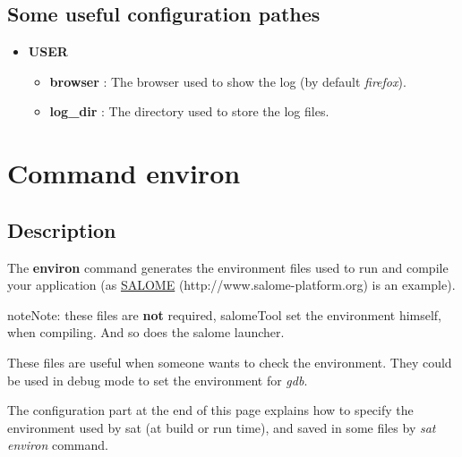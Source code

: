 \documentclass[a4paper,10pt,english]{sphinxmanual}
\begin{document}
\subsection{Some useful configuration pathes}
\label{commands/log:some-useful-configuration-pathes}\begin{itemize}
\item {} 
\textbf{USER}
\begin{itemize}
\item {} 
\textbf{browser} : The browser used to show the log (by default \emph{firefox}).

\item {} 
\textbf{log\_dir} : The directory used to store the log files.

\end{itemize}

\end{itemize}
\clearpage

\section{Command environ}
\label{commands/environ:svn}\label{commands/environ:command-environ}\label{commands/environ::doc}

\subsection{Description}
\label{commands/environ:description}
The \textbf{environ} command generates the environment files used
to run and compile your application (as \href{http://www.salome-platform.org}{SALOME} (http://www.salome-platform.org) is an example).

\begin{notice}{note}{Note:}
these files are \textbf{not} required,
salomeTool set the environment himself, when compiling.
And so does the salome launcher.

These files are useful when someone wants to check the environment.
They could be used in debug mode to set the environment for \emph{gdb}.
\end{notice}

The configuration part at the end of this page explains how
to specify the environment used by sat (at build or run time),
and saved in some files by \emph{sat environ} command.
\end{document}
